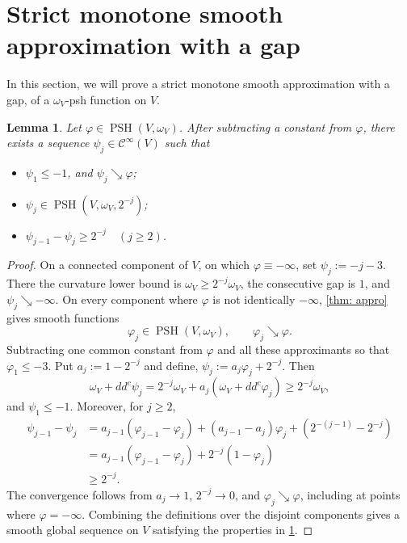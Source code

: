 \documentclass[12pt,reqno]{amsart}
\newtheorem{lem}{Lemma}[section]
\newcommand{\PSH}{\operatorname{PSH}}
\newcommand{\ddc}{dd^c}
\begin{document}
	\section{Strict monotone smooth approximation with a gap}
	In this section, we will prove a strict monotone smooth approximation with a gap, of a  $\omega_V$-psh function on $V$.
	
	\begin{lem}\label{lem:strict-gap-approx}
		Let $\varphi\in\PSH(V,\omega_V)$. After subtracting a constant from $\varphi$, there exists a sequence $\psi_j\in \mathcal C^\infty(V)$ such that
		\begin{itemize}
			\item $\psi_1\leq-1$, and $\psi_j\searrow\varphi$;
			\item $\psi_j\in \PSH(V,\omega_V,2^{-j})$;
			\item $\psi_{j-1}-\psi_j\geq 2^{-j}\quad(j\geq2)$.
		\end{itemize}
	\end{lem}
	
	\begin{proof}
		
		On a connected component of $V$, on which $\varphi\equiv-\infty$, set  $ \psi_j:=-j-3$.
		There the curvature lower bound is $\omega_V\geq2^{-j}\omega_V$, the consecutive gap is $1$, and $\psi_j\searrow-\infty$.
		On every component where $\varphi$ is not identically $-\infty$,
		\cref{thm: appro} gives smooth functions
		\[
		\varphi_{j}\in\PSH(V,\omega_V),
		\qquad
		\varphi_{j}\searrow {\varphi}.
		\]
		Subtracting  one common constant from $\varphi$ and all these approximants so that $\varphi_{1}\leq-3$.
		Put $a_j:=1-2^{-j}$ and define, $\psi_j:=a_j\varphi_{j}+2^{-j}$.
		Then
		\[
		\omega_V+\ddc\psi_j
		=2^{-j}\omega_V+a_j(\omega_V+\ddc\varphi_{j})
		\geq2^{-j}\omega_V,
		\]
		and $\psi_1\leq-1$. Moreover, for $j\geq2$,
		\begin{align*}
			\psi_{j-1}-\psi_j
			&=a_{j-1}(\varphi_{j-1}-\varphi_{j})
			+(a_{j-1}-a_j)\varphi_{j}
			+(2^{-(j-1)}-2^{-j})\\
			&=a_{j-1}(\varphi_{j-1}-\varphi_{j})
			+2^{-j}(1-\varphi_{j})\\
			&\geq2^{-j}.
		\end{align*}
		The convergence follows from $a_j\to1$, $2^{-j}\to0$, and $\varphi_{j}\searrow\varphi$, including at points where $\varphi=-\infty$.
		Combining the definitions over the disjoint components gives a smooth global sequence on $V$ satisfying the properties in \cref{lem:strict-gap-approx}.
	\end{proof}
	
\end{document}
